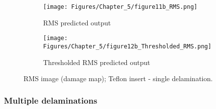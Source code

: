 \begin{figure} [!h]
	\begin{subfigure}[b]{.5\textwidth}
		\centering
		\texttt{[image: Figures/Chapter\_5/figure11b\_RMS.png]}
		\caption{RMS predicted output}
		\label{fig:RMS_CFRP_Teflon_3o_saeed}
	\end{subfigure}
	\hfill
	\begin{subfigure}[b]{.42\textwidth}
		\centering
		\texttt{[image: Figures/Chapter\_5/figure12b\_Thresholded\_RMS.png]}
		\caption{Thresholded RMS predicted output} 
		\label{fig:RMS_CFRP_Teflon_3o_ijjeh}
	\end{subfigure}
	\caption{RMS image (damage map); Teflon insert - single delamination.}
	\label{fig:RMS_CFRP_Teflon_3o_images}
\end{figure} 
\clearpage
\subsubsection{Multiple delaminations}
\label{sec5322}


